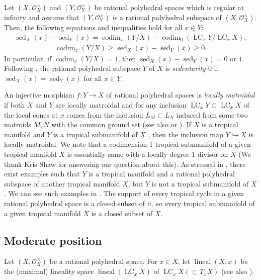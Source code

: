 \documentclass[a4paper,dvipdfmx,reqno,12pt]{amsart}
\theoremstyle{definition}
\newcommand{\opn}[1]{\operatorname{#1}}
\newcommand{\hookto}{\hookrightarrow}
\numberwithin{equation}{section}
\begin{document}
Let $(X,\mathcal{O}_X^{\times})$ and 
$(Y,\mathcal{O}_Y^{\times})$ be rational
polyhedral spaces which is regular at infinity and
assume that $(Y,\mathcal{O}_Y^{\times})$
is a rational polyhedral subspace of
$(X,\mathcal{O}_X^{\times})$. 
Then, the following equations and inequalities hold
for all $x\in Y$:
\begin{align}
\opn{sed}_X(x)-\opn{sed}_Y(x)=
\opn{codim}_x(Y/X)-\opn{codim}_0(\opn{LC}_x Y/\opn{LC}_xX),
\end{align}
\begin{align}
\opn{codim}_x(Y/X) \geq 
\opn{sed}_X(x)-\opn{sed}_Y(x)\geq 0.
\end{align}
In particular, if $\opn{codim}_x(Y/X)=1$,
then $\opn{sed}_X(x)-\opn{sed}_Y(x)=0$ or $1$.
Following \cite[]{demedrano2023chern},
the rational polyhedral subspace $Y$ of $X$ is
\emph{sedentarity-$0$} if
$\opn{sed}_X(x)=\opn{sed}_Y(x)$ for all
$x\in Y$.



An injective morphism $f\colon Y\to X$ of rational polyhedral spaces
is \emph{locally matroidal} if both $X$ and $Y$ are locally matroidal
and for any inclusion $\opn{LC}_x Y\subset \opn{LC}_x X$ of
the local cones at $x$ comes from the inclusion
$L_M\subset L_N$ induced from some two matroids $M,N$ with
the common ground set
(see also \cite[]{MR3041763} 
or \cite[]{MR3032930}).  
If $X$ is a tropical manifold and $Y$ is
a tropical submanifold of $X$
\cite[Definition 2.14]{demedrano2023chern},
then the inclusion map $Y\hookto X$ is locally matroidal. 
We note that a codimension $1$ tropical submanifold of a given
tropical manifold $X$ is essentially same with
a locally degree $1$ divisor on $X$
\cite[Definition 4.3]{shaw2015tropical}
(We thank Kris Shaw for answering our question about this).
As stressed in \cite[Example 2.15]{demedrano2023chern},
there exist examples such that $Y$ is a tropical manifold and
a rational polyhedral subspace of another tropical manifold
$X$, but $Y$ is not a tropical submanifold of $X$.
We can see such examples
in \cite{MR2594592,MR3339531,shaw2015tropical}.
The support of every tropical cycle in a given
rational polyhedral space is
a closed subset of it,
so every tropical submanifold of a given
tropical manifold $X$ is a closed subset of $X$.

\subsection{Moderate position}
Let $(X,\mathcal{O}_X^{\times})$ be
a rational polyhedral space.
For $x\in X$, let 
$\opn{lineal}(X,x)$ be the (maximal) lineality space
$\opn{lineal}(\opn{LC}_x X)$ of 
$\opn{LC}_x X (\subset T_x X)$
\cite[]{MR4246795}
(see also \cite[]{demedrano2023chern}).
\end{document}
